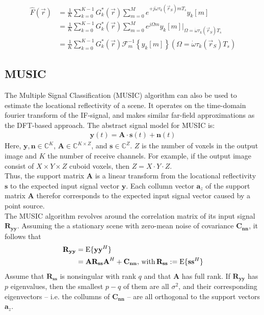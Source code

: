 \begin{align}
    \hat F(\vec r) & = \frac{1}{K}\sum_{k=0}^{K-1}G_k^\ast(\vec r)
    \sum_{m=0}^{M} e^{+j\dot\omega\tau_k(\vec r_S)mT_s} y_k[m]     \\
                   & = \frac{1}{K}\sum_{k=0}^{K-1}G_k^\ast(\vec r)
    \sum_{m=0}^{M} e^{j\Omega m} y_k[m]
    \Big|_{\Omega=\dot\omega\tau_k(\vec r_S)T_s}                   \\
                   & = \frac{1}{K}\sum_{k=0}^{K-1}G_k^\ast(\vec r)
    \mathcal{F}_m^{-1} \left\{ y_k[m]\right\}(\Omega=\dot\omega\tau_k(\vec r_S)T_s)
\end{align}

\subsection{MUSIC}
The Multiple Signal Classification (MUSIC) algorithm can also be used to estimate the locational reflectivity of a scene.
It operates on the time-domain fourier transform of the IF-signal, and makes similar far-field approximations as the DFT-based approach.
The abstract signal model for MUSIC is:
\begin{align}
    \mathbf y(t) = \mathbf A \cdot \mathbf s(t) + \mathbf n(t)
\end{align}
Here, $\mathbf y,\mathbf n \in \mathbb{C}^{K}$,
$\mathbf A \in \mathbb{C}^{K \times Z}$, and
$\mathbf s \in \mathbb{C}^{Z}$.
$Z$ is the number of voxels in the output image and $K$ the number of receive channels.
For example, if the output image consist of $X \times Y \times Z$ cuboid voxels, then $Z=X\cdot Y\cdot Z$. \\
Thus, the support matrix $\mathbf A$ is a linear transform from the locational reflectivity $\mathbf{s}$
to the expected input signal vector $\mathbf{y}$.
Each collumn vector $\mathbf a_z$ of the support matrix $\mathbf A$ therefor corresponds to the expected input signal vector caused by a point source. \\

The MUSIC algorithm revolves around the correlation matrix of its input signal $\mathbf{R_{yy}}$.
Assuming the a stationary scene with zero-mean noise of covariance $\mathbf{C_{nn}}$,
it follows that
\begin{align}
    \mathbf{R_{yy}} & = \text{E}\{\mathbf{yy}^H\}             \\
                    & =\mathbf{AR_{ss}A}^H + \mathbf{C_{nn}},
    \text{\,with\,} \mathbf{R_{ss}} := \text{E}\{\mathbf{ss}^H\}
\end{align}
Assume that $\mathbf{R_{ss}}$ is nonsingular with rank $q$ and that $\mathbf{A}$ has full rank.
If $\mathbf{R_{yy}}$ has $p$ eigenvalues, then the smallest $p-q$ of them are all $\sigma^2$,
and their corresponding eigenvectors -- i.e. the collumns of $\mathbf{C_{nn}}$ -- are all orthogonal to the support vectors $\mathbf a_z$.

